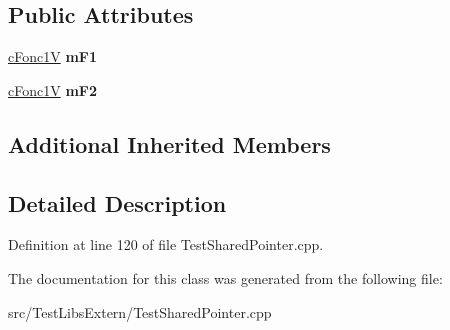\subsection*{Public Attributes}
\begin{DoxyCompactItemize}
\item 
\hyperlink{classMMVII_1_1cFonc1V}{c\+Fonc1V} {\bfseries m\+F1}\hypertarget{classMMVII_1_1cDataFonc1V__Som_a21bc2cd4e32c4af23ef57c1b2fe2498d}{}\label{classMMVII_1_1cDataFonc1V__Som_a21bc2cd4e32c4af23ef57c1b2fe2498d}

\item 
\hyperlink{classMMVII_1_1cFonc1V}{c\+Fonc1V} {\bfseries m\+F2}\hypertarget{classMMVII_1_1cDataFonc1V__Som_a2620a792389a2efc40c7baa62b36c090}{}\label{classMMVII_1_1cDataFonc1V__Som_a2620a792389a2efc40c7baa62b36c090}

\end{DoxyCompactItemize}
\subsection*{Additional Inherited Members}


\subsection{Detailed Description}


Definition at line 120 of file Test\+Shared\+Pointer.\+cpp.



The documentation for this class was generated from the following file\+:\begin{DoxyCompactItemize}
\item 
src/\+Test\+Libs\+Extern/Test\+Shared\+Pointer.\+cpp\end{DoxyCompactItemize}
